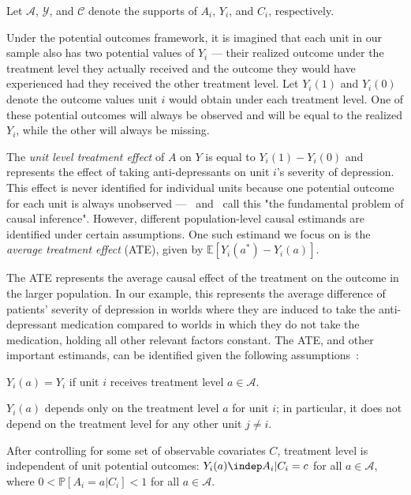 Let $\mathcal{A}$, $\mathcal{Y}$, and $\mathcal{C}$ denote the supports of $A_{i}$, $Y_{i}$, and $C_{i}$,
respectively. 

Under the potential outcomes framework, it is imagined that each unit in our sample also has
two potential values of $Y_{i}$ --- their realized outcome under the treatment level they actually received
and the outcome they would have experienced had they received the other treatment level. Let $Y_{i}(1)$
and $Y_{i}(0)$ denote the outcome values unit $i$ would obtain under each treatment level. One of these
potential outcomes will always be observed and will be equal to the realized $Y_{i}$, while the other
will always be missing. 

The \textit{unit level treatment effect} of $A$ on $Y$ is equal to $Y_{i}(1) - Y_{i}(0)$ and represents 
the effect of taking anti-depressants on unit $i$'s severity of depression. This
effect is never identified for individual units because one potential outcome for each unit is always
unobserved ---~\cite{rubin1974} and~\cite{holland1986} call this "the fundamental problem of causal 
inference". However, different population-level causal estimands are identified under certain assumptions. 
One such estimand we focus on is the \textit{average treatment effect} (ATE), given by 
$\mathbb{E}[Y_{i}(a^{*}) - Y_{i}(a)]$.

The ATE represents the average causal effect of the treatment on the outcome in the larger population. In
our example, this represents the average difference of patients' severity of depression in worlds where they 
are induced to take the anti-depressant medication compared to worlds in which they 
do not take the medication, holding all other relevant factors constant. The ATE, and other 
important estimands, can be identified given the following assumptions~\citep{imbens2015}: 

\begin{assumption}[Consistency]\label{assm:Consistency}
$Y_{i}(a) = Y_{i}$ if unit $i$ receives treatment level $a \in \mathcal{A}$. 
\end{assumption}

\begin{assumption}[No interference]\label{assm:no_interference}
$Y_{i}(a)$ depends only on the treatment level $a$ for unit $i$; in particular, it does not depend on 
the treatment level for any other unit $j \neq i$. 
\end{assumption}

\begin{assumption}\label{assm:ignorability} After controlling for some set of 
observable covariates $C$, treatment level is independent of unit potential 
outcomes: $Y_{i}(a) \indep A_{i} | C_{i} = c$ for all $a \in \mathcal{A}$, where 
$0 < \mathbb{P}[A_{i} = a | C_{i}] < 1$ for all $a \in \mathcal{A}$. 
\end{assumption}

